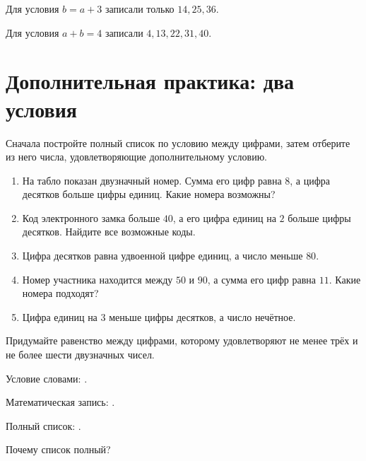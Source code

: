 \begin{warningbox}
  Для условия \(b=a+3\) записали только \(14,25,36\).
\end{warningbox}

\begin{warningbox}
  Для условия \(a+b=4\) записали \(4,13,22,31,40\).
\end{warningbox}

\newpage
\section{Дополнительная практика: два условия}

Сначала постройте полный список по условию между цифрами, затем отберите из
него числа, удовлетворяющие дополнительному условию.

\begin{practicebox}
  \begin{enumerate}[label=\textbf{\arabic*.}]
    \item На табло показан двузначный номер. Сумма его цифр равна \(8\),
      а цифра десятков больше цифры единиц. Какие номера возможны?
    \item Код электронного замка больше \(40\), а его цифра единиц на \(2\)
      больше цифры десятков. Найдите все возможные коды.
    \item Цифра десятков равна удвоенной цифре единиц, а число меньше \(80\).
    \item Номер участника находится между \(50\) и \(90\), а сумма его цифр
      равна \(11\). Какие номера подходят?
    \item Цифра единиц на \(3\) меньше цифры десятков, а число нечётное.
  \end{enumerate}
\end{practicebox}

\begin{fillbox}
  Придумайте равенство между цифрами, которому удовлетворяют не менее трёх и
  не более шести двузначных чисел.

  Условие словами: \answerblank[115mm].

  Математическая запись: \answerblank[45mm].

  Полный список: \answerblank[100mm].

  Почему список полный? 
\end{fillbox}

